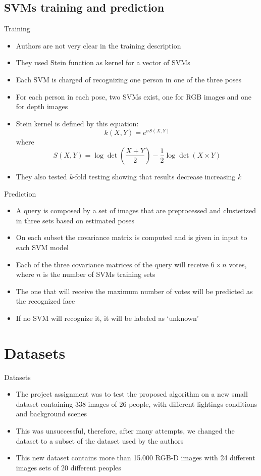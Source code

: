 \documentclass[unknownkeysallowed]{beamer}
\begin{document}
\subsection{SVMs training and prediction}
\begin{frame}{Training}
	\begin{itemize}
		\item Authors are not very clear in the training description
		\item They used Stein function as kernel for a vector of SVMs
		\item Each SVM is charged of recognizing one person in one of the three poses
		\item For each person in each pose, two SVMs exist, one for RGB	images and one for depth images
		\item Stein kernel is defined by this equation:
			$$
			k(X, Y) = e^{\sigma S(X,Y)}
			$$
			where
			$$
			S(X, Y) = \log\det\left(\frac{X +
			Y}{2}\right)-\frac{1}{2} \log \det(X\times Y)
			$$
		\item They also tested \textit{k}-fold testing showing that	results decrease increasing $k$

	\end{itemize}
\end{frame}

\begin{frame}{Prediction}
	\begin{itemize}
		\item A query is composed by a set of images that are preprocessed and clusterized in three sets based on estimated poses
		\item On each subset the covariance matrix is computed and is given in input to each SVM model
		\item Each of the three covariance matrices of the query will receive $6 \times n$ votes, where $n$ is the number of SVMs training sets
		\item The one that will receive the maximum number of votes	will be predicted as the recognized face
		\item If no SVM will recognize it, it will be labeled as `unknown'
	\end{itemize}
\end{frame}

\section{Datasets}
\begin{frame}{Datasets}
	\begin{itemize}
		\item The project assignment was to test the proposed algorithm	on a new small dataset containing 338 images of 26 people, with different lightings conditions and background scenes
		\item This was unsuccessful, therefore, after many attempts, we	changed the dataset to a subset of the dataset used by the authors
		\item This new dataset contains more than 15.000 RGB-D images with 24 different images sets of 20 different peoples
	\end{itemize}
\end{frame}
\end{document}
